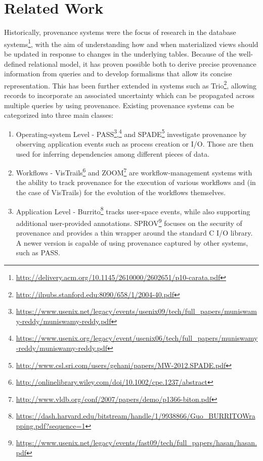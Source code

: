 \section{Related Work}

Historically, provenance systems were the focus of research in the database systems\footnote{\url{http://delivery.acm.org/10.1145/2610000/2602651/p10-carata.pdf}}, with the aim of understanding how and when materialized views should be updated in response to changes in the underlying tables. Because of the well-defined relational model, it has proven possible both to derive precise provenance information from queries and to develop formalisms that allow its concise representation. This has been further extended in systems such as Trio\footnote{\url{http://ilpubs.stanford.edu:8090/658/1/2004-40.pdf}}, allowing records to incorporate an associated uncertainty which can be propagated across multiple queries by using provenance.
Existing provenance systems can be categorized into three main classes:
\begin{enumerate}
	\item Operating-system Level -  PASS\footnote{\url{https://www.usenix.net/legacy/events/usenix09/tech/full_papers/muniswamy-reddy/muniswamy-reddy.pdf}},\footnote{\url{https://www.usenix.org/legacy/event/usenix06/tech/full_papers/muniswamy-reddy/muniswamy-reddy.pdf}} and SPADE\footnote{\url{http://www.csl.sri.com/users/gehani/papers/MW-2012.SPADE.pdf}} investigate provenance by observing application events such as process creation or I/O. Those are then used for inferring dependencies among different pieces of data.
	\item Workflows - VisTrails\footnote{\url{http://onlinelibrary.wiley.com/doi/10.1002/cpe.1237/abstract}} and ZOOM\footnote{\url{http://www.vldb.org/conf/2007/papers/demo/p1366-biton.pdf}} are workflow-management systems with the ability to track provenance for the execution of various workflows and (in the case of VisTrails) for the evolution of the workflows themselves.
	\item Application Level - Burrito\footnote{\url{https://dash.harvard.edu/bitstream/handle/1/9938866/Guo_BURRITOWrapping.pdf?sequence=1}} tracks user-space events, while also supporting additional user-provided annotations. SPROV\footnote{\url{https://www.usenix.net/legacy/events/fast09/tech/full_papers/hasan/hasan.pdf}} focuses on the security of provenance and provides a thin wrapper around the standard C I/O library. A newer version is capable of using provenance captured by other systems, such as PASS.
\end{enumerate}

